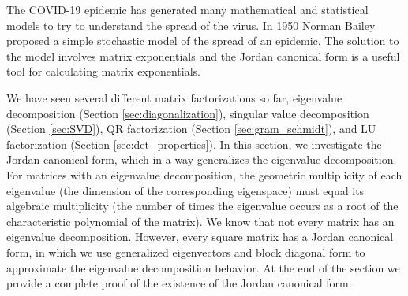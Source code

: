  \label{sec:JCF}

\vspace*{-17 pt}

\vspace*{13 pt}


The COVID-19 epidemic has generated many mathematical and statistical models to try to understand the spread of the virus. In 1950 Norman Bailey proposed a simple stochastic model of the spread of an epidemic. The solution to the model involves matrix exponentials and the Jordan canonical form is a useful tool for calculating matrix exponentials. 



We have seen several different matrix factorizations so far, eigenvalue decomposition (Section \ref{sec:diagonalization}), singular value decomposition (Section \ref{sec:SVD}), QR factorization (Section \ref{sec:gram_schmidt}), and LU factorization (Section \ref{sec:det_properties}). In this section, we investigate the Jordan canonical form, which in a way generalizes the eigenvalue decomposition. For matrices with an eigenvalue decomposition, the geometric multiplicity of each eigenvalue (the dimension of the corresponding eigenspace) must equal its algebraic multiplicity (the number of times the eigenvalue occurs as a root of the characteristic polynomial of the matrix). We know that not every matrix has an eigenvalue decomposition. However, every square matrix has a Jordan canonical form, in which we use generalized eigenvectors and block diagonal form to approximate the eigenvalue decomposition behavior. At the end of the section we provide a complete proof of the existence of the Jordan canonical form. 

